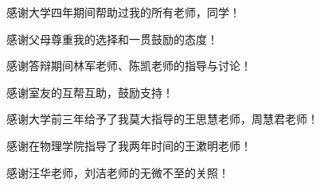 \documentclass[winfonts]{njuthesis}
\begin{document}
\mainmatter











\begin{acknowledgement}
感谢大学四年期间帮助过我的所有老师，同学！

感谢父母尊重我的选择和一贯鼓励的态度！

感谢答辩期间林军老师、陈凯老师的指导与讨论！

感谢室友的互帮互助，鼓励支持！

感谢大学前三年给予了我莫大指导的王思慧老师，周慧君老师！

感谢在物理学院指导了我两年时间的王漱明老师！

感谢汪华老师，刘洁老师的无微不至的关照！
\end{acknowledgement}




\end{document}
